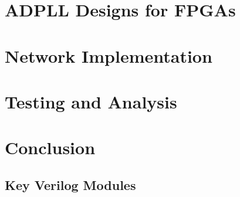 \documentclass[11pt,british]{report}
\begin{document}


\setcounter{chapter}{2}

\chapter{ADPLL Designs for FPGAs}\label{chap:3}



\setcounter{chapter}{3}

\chapter{Network Implementation}\label{chap:4}



\setcounter{chapter}{4}

\chapter{Testing and Analysis}\label{chap:5}



\setcounter{chapter}{5}

\chapter{Conclusion}\label{chap:6}



\setcounter{chapter}{6}

\pagebreak{}
{}
\fancyhead[LO,RE]{\slshape \nouppercase{\leftmark}}
\begin{small}

\end{small}
\begin{appendices}
\chapter{Key Verilog Modules}\label{adx:code}


\end{appendices}
\end{document}
